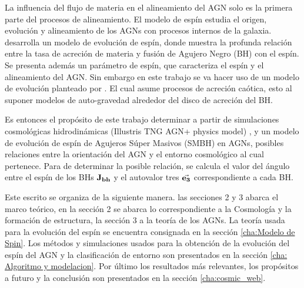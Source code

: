 La influencia del flujo de materia en el alineamiento del AGN solo es la primera parte del procesos de alineamiento. El modelo de espín estudia el origen, evolución y alineamiento de los AGNs con procesos internos de la galaxia. \cite{fanidakis2011} desarrolla un modelo de evolución de espín, donde muestra la profunda relación entre la tasa de acreción de materia y fusión de Agujero Negro (BH) con el espín. Se presenta además un parámetro de espín, que caracteriza el espín y el alineamiento del AGN. Sin embargo en este trabajo se va hacer uso de un modelo de evolución planteado por \cite{Bustamante2018b}. El cual asume procesos de acreción caótica, esto al suponer modelos de auto-gravedad alrededor del disco de acreción del BH. 
 
Es entonces el propósito de este trabajo determinar a partir de simulaciones cosmológicas hidrodinámicas (Illustris TNG AGN+ physics model) \cite{springel2010}, y un modelo de evolución de espín de Agujeros Súper Masivos (SMBH) en AGNs, posibles relaciones entre la orientación del AGN y el entorno cosmológico al cual pertenece. Para de determinar la posible relación, se calcula el valor del ángulo  entre el espín de los BHs ${\bf{J_{bh}}}$ y el autovalor tres $\vec{\bf{e_3}}$ correspondiente a cada BH.

Este escrito se organiza de la siguiente manera. las secciones 2 y 3 abarca el marco teórico, en la sección 2 se abarca lo correspondiente a la Cosmología y la formación de estructura, la sección 3 a la teoría de los AGNs. La teoría usada para la evolución del espín se encuentra consignada en la sección \ref{cha:Modelo de Spin}. Los métodos y simulaciones usados para la obtención de la evolución del espín del AGN y la clasificación de entorno son presentados en la sección \ref{cha: Algoritmo y modelacion}. Por último los resultados  más relevantes, los propósitos a futuro y la conclusión son presentados en la sección \ref{cha:cosmic_web}.

